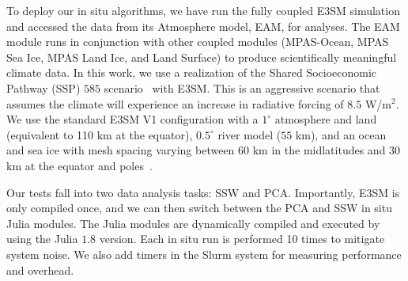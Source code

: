 \documentclass{juliacon}
\begin{document}
To deploy our in situ algorithms, we have run the fully coupled E3SM simulation and accessed the data from its Atmosphere model, EAM, for analyses. The EAM module runs in conjunction with other coupled modules (MPAS-Ocean, MPAS Sea Ice, MPAS Land Ice, and Land Surface) to produce scientifically meaningful climate data. In this work, we use a realization of the Shared Socioeconomic Pathway (SSP) $585$ scenario~\cite{Eyring} with E3SM. This is an aggressive scenario that assumes the climate will experience an increase in radiative forcing of $8.5$ W/m$^2$. We use the standard E3SM V1 configuration with a $1^{\circ}$ atmosphere and land (equivalent to 110 km at the equator), $0.5^{\circ}$ river model ($55$ km), and an ocean and sea ice with mesh spacing varying between $60$ km in the midlatitudes and $30$ km at the equator and poles~\cite{e3sm_v1}. %


Our tests fall into two data analysis tasks: SSW and PCA. Importantly, E3SM is only compiled once, and we can then switch between the PCA and SSW in situ Julia modules. The Julia modules are dynamically compiled and executed by using the Julia $1.8$ version. Each in situ run is performed 10 times to mitigate system noise. We also add timers in the Slurm system for measuring performance and overhead.
\end{document}
